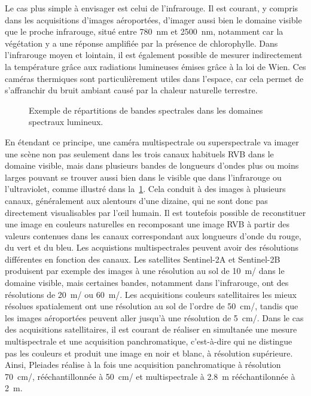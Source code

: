 Le cas plus simple à envisager est celui de l'infrarouge. Il est courant, y compris dans les acquisitions d'images aéroportées, d'imager aussi bien le domaine visible que le proche infrarouge, situé entre \SI{780}{\nano\meter} et \SI{2 500}{\nano\meter}, notamment car la végétation y a une réponse amplifiée par la présence de chlorophylle. Dans l'infrarouge moyen et lointain, il est également possible de mesurer indirectement la température grâce aux radiations lumineuses émises grâce à la loi de Wien. Ces caméras thermiques sont particulièrement utiles dans l'espace, car cela permet de s'affranchir du bruit ambiant causé par la chaleur naturelle terrestre.

\begin{figure}
  \resizebox{\textwidth}{!}{
  
  }
  \caption{Exemple de répartitions de bandes spectrales dans les domaines spectraux lumineux.}
  \label{fig:multispectral}
\end{figure}

En étendant ce principe, une caméra multispectrale ou superspectrale va imager une scène non pas seulement dans les trois canaux habituels \gls{RVB} dans le domaine visible, mais dans plusieurs bandes de longueurs d'ondes plus ou moins larges pouvant se trouver aussi bien dans le visible que dans l'infrarouge ou l'ultraviolet, comme illustré dans la~\cref{fig:multispectral}. Cela conduit à des images à plusieurs canaux, généralement aux alentours d'une dizaine, qui ne sont donc pas directement visualisables par l'\oe{}il humain. Il est toutefois possible de reconstituer une image en couleurs naturelles en recomposant une image \gls{RVB} à partir des valeurs contenues dans les canaux correspondant aux longueurs d'onde du rouge, du vert et du bleu. Les acquistions multispectrales peuvent avoir des résolutions différentes en fonction des canaux. Les satellites Sentinel-2A et Sentinel-2B produisent par exemple des images à une résolution au sol de \SI{10}{\meter/\px} dans le domaine visible, mais certaines bandes, notamment dans l'infrarouge, ont des résolutions de \SI{20}{\meter/\px} ou \SI{60}{\meter/\px}. Les acquisitions couleurs satellitaires les mieux résolues spatialement ont une résolution au sol de l'ordre de \SI{50}{\centi\meter/\px}, tandis que les images aéroportées peuvent aller jusqu'à une résolution de \SI{5}{\centi\meter/\px}. Dans le cas des acquisitions satellitaires, il est courant de réaliser en simultanée une mesure multispectrale et une acquisition panchromatique, c'est-à-dire qui ne distingue pas les couleurs et produit une image en noir et blanc, à résolution supérieure. Ainsi, \gls{Pleiades} réalise à la fois une acquisition panchromatique à résolution \SI{70}{\centi\meter/\px}, rééchantillonnée à \SI{50}{\centi\meter/\px} et multispectrale à \SI{2,8}{\meter} rééchantilonnée à \SI{2}{\meter}.

